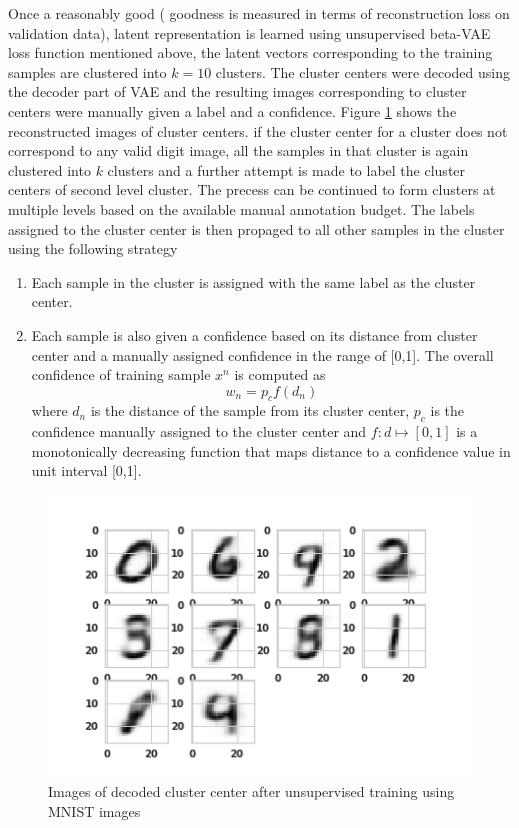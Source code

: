 \documentclass[runningheads]{llncs}
\begin{document}
Once a reasonably good ( goodness is measured in terms of reconstruction loss on validation data), latent representation is learned using  unsupervised beta-VAE loss function mentioned above, the latent vectors corresponding to the training samples are clustered into $k=10$ clusters.
The cluster centers were decoded using the decoder part of VAE and the resulting images corresponding to cluster centers were manually given a label and a confidence.
Figure \ref{cluster_center_1_gmm} shows the reconstructed images of cluster centers.
if the cluster center for a cluster does not correspond to any valid digit image, all the samples in that cluster is again clustered into $k$ clusters and a further attempt is made to label the cluster centers of second level cluster.
The precess can be continued to form clusters at multiple levels based on the available manual annotation budget.
The labels assigned to the cluster center is then propaged to all other samples in the cluster using the following strategy
\begin{enumerate}
    \item Each sample in the cluster is assigned with the  same label as the cluster center.
    \item Each sample is also given a confidence based on its distance from cluster center and  a manually assigned confidence in the range of [0,1]. The overall confidence of  training sample $x^n$ is computed as
\begin{equation}
w_n = p_cf(d_n)
\end{equation}
where $d_n$ is the distance of the sample from its cluster center, $p_c$  is the confidence manually assigned to the cluster center and $f: d \mapsto [0,1]$ is a monotonically decreasing function that maps distance to a confidence value in unit interval [0,1].
\end{enumerate}

\begin{figure}[]
\centering
\includegraphics[width=\linewidth]{cluster_centers_epoch_1_0.png}
\caption{Images of decoded cluster center after unsupervised training using MNIST images}
\label{cluster_center_1_gmm}
\end{figure}
\end{document}
